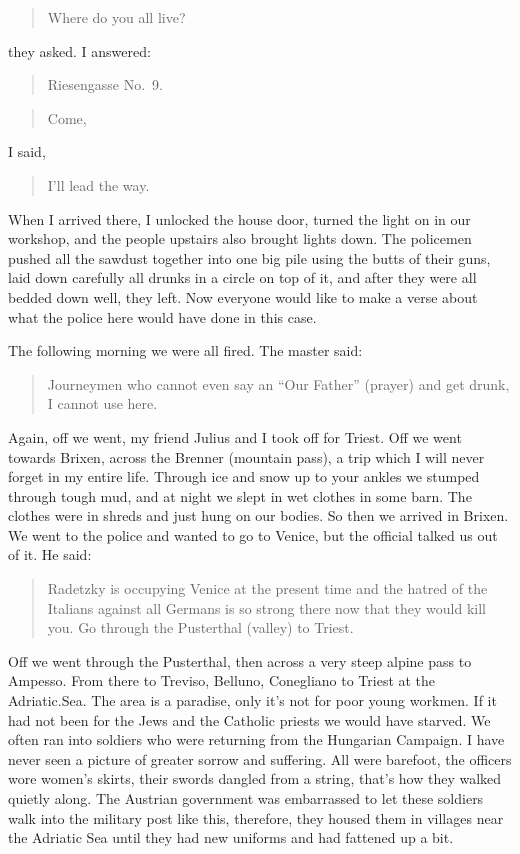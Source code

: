 \begin{quote}
Where do you all live?
\end{quote}

they asked. I answered:

\begin{quote}
Riesengasse No.~9.
\end{quote}

\begin{quote}
Come,
\end{quote}

I said,

\begin{quote}
I'll lead the way.
\end{quote}

When I arrived there, I unlocked the house door, turned the light on in our workshop, and the people upstairs also brought lights down. The policemen pushed all the sawdust together into one big pile using the butts of their guns, laid down carefully all drunks in a circle on top of it, and after they were all bedded down well, they left. Now everyone would like to make a verse about what the police here would have done in this case.

The following morning we were all fired. The master said:

\begin{quote}
Journeymen who cannot even say an ``Our Father'' (prayer) and get drunk, I cannot use here.
\end{quote}

Again, off we went, my friend Julius and I took off for Triest. Off we went towards Brixen, across the Brenner (mountain pass), a trip which I will never forget in my entire life. Through ice and snow up to your ankles we stumped through tough mud, and at night we slept in wet clothes in some barn. The clothes were in shreds and just hung on our bodies. So then we arrived in Brixen. We went to the police and wanted to go to Venice, but the official talked us out of it. He said:

\begin{quote}
Radetzky is occupying Venice at the present time and the hatred of the Italians against all Germans is so strong there now that they would kill you. Go through the Pusterthal (valley) to Triest.
\end{quote}

Off we went through the Pusterthal, then across a very steep alpine pass to Ampesso. From there to Treviso, Belluno, Conegliano to Triest at the Adriatic.Sea. The area is a paradise, only it's not for poor young workmen. If it had not been for the Jews and the Catholic priests we would have starved. We often ran into soldiers who were returning from the Hungarian Campaign. I have never seen a picture of greater sorrow and suffering. All were barefoot, the officers wore women's skirts, their swords dangled from a string, that's how they walked quietly along. The Austrian government was embarrassed to let these soldiers walk into the military post like this, therefore, they housed them in villages near the Adriatic Sea until they had new uniforms and had fattened up a bit.

